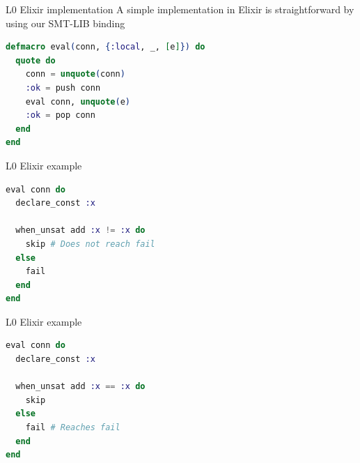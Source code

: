 \documentclass{beamer}
\begin{document}
  \begin{frame}[fragile]{L0 Elixir implementation}
    A simple implementation in Elixir is straightforward by using our SMT-LIB binding

    \bigskip

    \begin{lstlisting}[language=elixir,numbers=none,frame=none]
defmacro eval(conn, {:local, _, [e]}) do
  quote do
    conn = unquote(conn)
    :ok = push conn
    eval conn, unquote(e)
    :ok = pop conn
  end
end
    \end{lstlisting}
  \end{frame}
  \begin{frame}[fragile]{L0 Elixir example}
    \begin{lstlisting}[language=elixir,numbers=none,frame=none]
eval conn do
  declare_const :x

  when_unsat add :x != :x do
    skip # Does not reach fail
  else
    fail
  end
end
    \end{lstlisting}
  \end{frame}
  \begin{frame}[fragile]{L0 Elixir example}
    \begin{lstlisting}[language=elixir,numbers=none,frame=none]
eval conn do
  declare_const :x

  when_unsat add :x == :x do
    skip
  else
    fail # Reaches fail
  end
end
    \end{lstlisting}
  \end{frame}
\end{document}
